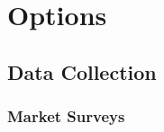 \documentclass[11pt,]{book}
\begin{document}
\hypertarget{options}{%
\chapter{Options}\label{options}}

\hypertarget{data-collection-1}{%
\section{Data Collection}\label{data-collection-1}}

\hypertarget{market-surveys}{%
\subsection*{Market Surveys}\label{market-surveys}}
\end{document}
